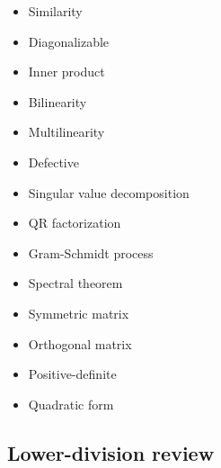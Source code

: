 \begin{itemize}
\item
  Similarity
\item
  Diagonalizable
\item
  Inner product
\item
  Bilinearity
\item
  Multilinearity
\item
  Defective
\item
  Singular value decomposition
\item
  QR factorization
\item
  Gram-Schmidt process
\item
  Spectral theorem
\item
  Symmetric matrix
\item
  Orthogonal matrix
\item
  Positive-definite
\item
  Quadratic form
\end{itemize}

\hypertarget{lower-division-review}{%
\subsection{Lower-division review}\label{lower-division-review}}

